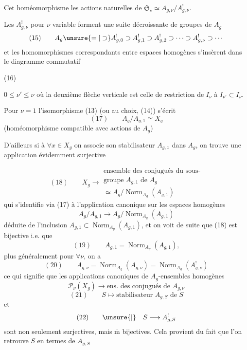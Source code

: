 Cet homéomorphisme  les actions
naturelles de $\mathfrak S_\nu\simeq A_{g,\nu}/A_{g,\nu}^!$.

Les $A_{g,\nu}^!$ pour $\nu$ variable forment une
suite décroissante de groupes de $A_g$
\[
(15)\qquad A_g\unsure{=|\supset}A_{g,0}^!\supset A_{g,1}^!\supset A_{g,2}^!
\supset\cdots\supset A_{g,\nu}^!\supset\cdots
\]
et les homomorphismes correspondants
entre espaces homogènes  s'insèrent dans le
diagramme commutatif  

\begin{samepage}
(16)\quad
{}
\end{samepage}
\quad $0\leq\nu'\leq\nu$
où la deuxième flèche verticale est celle de
restriction de $I_\nu$ à $I_{\nu'}\subset I_\nu$.

Pour $\nu=1$  l'isomorphisme (13) (ou au choix,
(14)) s'écrit
\[
(17)\qquad A_g/A_{g,1}\simeq X_g
\]
(homéomorphisme compatible avec  actions de $A_g$)

D'ailleurs si à $\forall x\in X_g$ on associe son
stabilisateur $A_{g,x}$ dans $A_g$, on trouve une
application évidemment surjective

\[
(18)\qquad X_g\longrightarrow
\begin{gathered}
\text{ensemble des conjugués du sous-}\\
\text{groupe }A_{g,1}\text{ de }A_g\\
\simeq A_g/\operatorname{Norm}_{A_g}(A_{g,1})
\end{gathered}
\]
qui s'identifie via (17) à l'application canonique
sur les espaces homogènes
\[
 A_g/A_{g,1}\longrightarrow A_g/\operatorname{Norm}_{A_g}(A_{g,1})
\]
déduite de l'inclusion $A_{g,1}\subset\operatorname{Norm}_{A_g}(A_{g,1})$,
et on voit de suite que (18) est
bijective i.e. que 
\[
(19)\qquad A_{g,1}=\operatorname{Norm}_{A_g}(A_{g,1}),
\]
plus généralement pour $\forall\nu$, on a
\[
(20)\qquad A_{g,\nu}=\operatorname{Norm}_{A_g}(A_{g,\nu})
=\operatorname{Norm}_{A_g}(A_{g,\nu}^!)
\]
ce qui signifie que les applications canoniques
de $A_g$-ensembles homogènes
\[
\mathcal P_\nu(X_g)\longrightarrow\text{ens. des conjugués de }A_{g,\nu}
\]
\[
(21)\qquad S\longmapsto\text{stabilisateur }A_{g,S}\text{ de }S
\]
et
\[
(22)\qquad\unsure{\vert}\quad S\longmapsto A_{g,S}^!
\]
sont non seulement surjectives, mais $\overline{\mathrm m}$ bijectives.
Cela provient du fait que l'on retrouve
$S$ en termes de $A_{g,S}$\deleted{${}^!$} 
  


